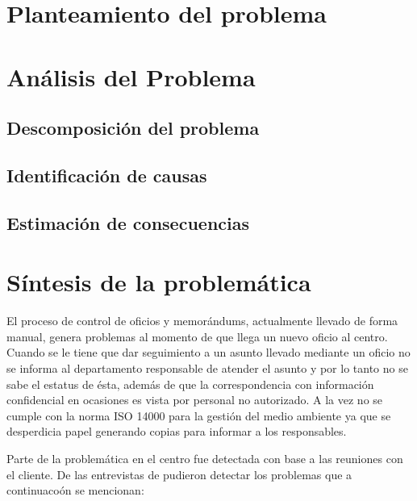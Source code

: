 \section{Planteamiento del problema}
\section{Análisis del Problema}
	\subsection{Descomposición del problema}
	\subsection{Identificación de causas}
	\subsection{Estimación de consecuencias}
\section{Síntesis de la problemática}





El proceso de control de oficios y memorándums, actualmente llevado de forma manual, genera problemas al momento de que llega un nuevo oficio al centro. Cuando se le tiene que dar seguimiento a un asunto llevado mediante un oficio no se informa al departamento responsable de atender el asunto y por lo tanto no se sabe el estatus de ésta, además de que la correspondencia con información confidencial en ocasiones es vista por personal no autorizado. A la vez no se cumple con la norma ISO 14000 para la gestión del medio ambiente ya que se desperdicia papel generando copias para informar a los responsables.

Parte de la problemática en el centro fue detectada con base a las reuniones con el cliente. De las entrevistas de pudieron detectar los problemas que a continuacoón se mencionan:

